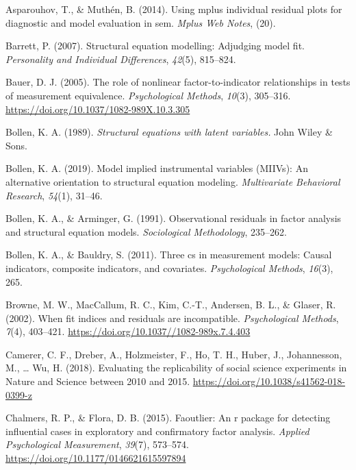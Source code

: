 \documentclass[
  english,
  man]{apa6}
\newlength{\cslhangindent}
\newenvironment{cslreferences}%
  {\setlength{\parindent}{0pt}%
  \everypar{\setlength{\hangindent}{\cslhangindent}}\ignorespaces}%
  {\par}
\begin{document}
\hypertarget{refs}{}
\begin{cslreferences}
\leavevmode\hypertarget{ref-asparouhov2014using}{}%
Asparouhov, T., \& Muthén, B. (2014). Using mplus individual residual plots for diagnostic and model evaluation in sem. \emph{Mplus Web Notes}, (20).

\leavevmode\hypertarget{ref-barrett2007structural}{}%
Barrett, P. (2007). Structural equation modelling: Adjudging model fit. \emph{Personality and Individual Differences}, \emph{42}(5), 815--824.

\leavevmode\hypertarget{ref-Bauer2005}{}%
Bauer, D. J. (2005). The role of nonlinear factor-to-indicator relationships in tests of measurement equivalence. \emph{Psychological Methods}, \emph{10}(3), 305--316. \url{https://doi.org/10.1037/1082-989X.10.3.305}

\leavevmode\hypertarget{ref-bollen_structural_1989}{}%
Bollen, K. A. (1989). \emph{Structural equations with latent variables.} John Wiley \& Sons.

\leavevmode\hypertarget{ref-bollen2019model}{}%
Bollen, K. A. (2019). Model implied instrumental variables (MIIVs): An alternative orientation to structural equation modeling. \emph{Multivariate Behavioral Research}, \emph{54}(1), 31--46.

\leavevmode\hypertarget{ref-bollen1991observational}{}%
Bollen, K. A., \& Arminger, G. (1991). Observational residuals in factor analysis and structural equation models. \emph{Sociological Methodology}, 235--262.

\leavevmode\hypertarget{ref-bollen2011three}{}%
Bollen, K. A., \& Bauldry, S. (2011). Three cs in measurement models: Causal indicators, composite indicators, and covariates. \emph{Psychological Methods}, \emph{16}(3), 265.

\leavevmode\hypertarget{ref-Browne2002}{}%
Browne, M. W., MacCallum, R. C., Kim, C.-T., Andersen, B. L., \& Glaser, R. (2002). When fit indices and residuals are incompatible. \emph{Psychological Methods}, \emph{7}(4), 403--421. \url{https://doi.org/10.1037//1082-989x.7.4.403}

\leavevmode\hypertarget{ref-Camerer2018}{}%
Camerer, C. F., Dreber, A., Holzmeister, F., Ho, T. H., Huber, J., Johannesson, M., \ldots{} Wu, H. (2018). Evaluating the replicability of social science experiments in Nature and Science between 2010 and 2015. \url{https://doi.org/10.1038/s41562-018-0399-z}

\leavevmode\hypertarget{ref-faoutlier}{}%
Chalmers, R. P., \& Flora, D. B. (2015). Faoutlier: An r package for detecting influential cases in exploratory and confirmatory factor analysis. \emph{Applied Psychological Measurement}, \emph{39}(7), 573--574. \url{https://doi.org/10.1177/0146621615597894}


\end{cslreferences}
\end{document}
